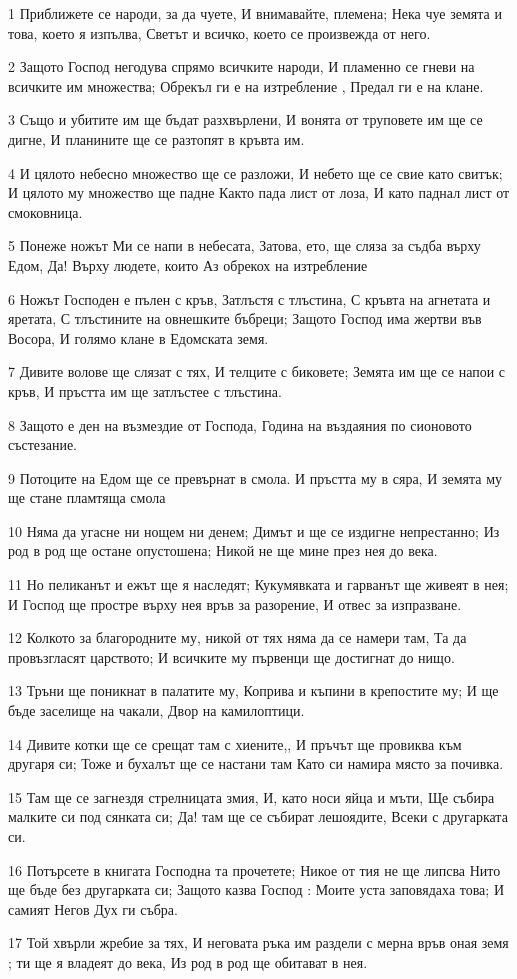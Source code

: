 \par 1 Приближете се народи, за да чуете, И внимавайте, племена; Нека чуе земята и това, което я изпълва, Светът и всичко, което се произвежда от него.
\par 2 Защото Господ негодува спрямо всичките народи, И пламенно се гневи на всичките им множества; Обрекъл ги е на изтребление , Предал ги е на клане.
\par 3 Също и убитите им ще бъдат разхвърлени, И вонята от труповете им ще се дигне, И планините ще се разтопят в кръвта им.
\par 4 И цялото небесно множество ще се разложи, И небето ще се свие като свитък; И цялото му множество ще падне Както пада лист от лоза, И като паднал лист от смоковница.
\par 5 Понеже ножът Ми се напи в небесата, Затова, ето, ще сляза за съдба върху Едом, Да! Върху людете, които Аз обрекох на изтребление
\par 6 Ножът Господен е пълен с кръв, Затлъстя с тлъстина, С кръвта на агнетата и яретата, С тлъстините на овнешките бъбреци; Защото Господ има жертви във Восора, И голямо клане в Едомската земя.
\par 7 Дивите волове ще слязат с тях, И телците с биковете; Земята им ще се напои с кръв, И пръстта им ще затлъстее с тлъстина.
\par 8 Защото е ден на възмездие от Господа, Година на въздаяния по сионовото състезание.
\par 9 Потоците на Едом ще се превърнат в смола. И пръстта му в сяра, И земята му ще стане пламтяща смола
\par 10 Няма да угасне ни нощем ни денем; Димът и ще се издигне непрестанно; Из род в род ще остане опустошена; Никой не ще мине през нея до века.
\par 11 Но пеликанът и ежът ще я наследят; Кукумявката и гарванът ще живеят в нея; И Господ ще простре върху нея връв за разорение, И отвес за изпразване.
\par 12 Колкото за благородните му, никой от тях няма да се намери там, Та да провъзгласят царството; И всичките му първенци ще достигнат до нищо.
\par 13 Тръни ще поникнат в палатите му, Коприва и къпини в крепостите му; И ще бъде заселище на чакали, Двор на камилоптици.
\par 14 Дивите котки ще се срещат там с хиените,, И пръчът ще провиква към другаря си; Тоже и бухалът ще се настани там Като си намира място за почивка.
\par 15 Там ще се загнездя стрелницата змия, И, като носи яйца и мъти, Ще събира малките си под сянката си; Да! там ще се събират лешоядите, Всеки с другарката си.
\par 16 Потърсете в книгата Господна та прочетете; Никое от тия не ще липсва Нито ще бъде без другарката си; Защото казва Господ : Моите уста заповядаха това; И самият Негов Дух ги събра.
\par 17 Той хвърли жребие за тях, И неговата ръка им раздели с мерна връв оная земя ; ти ще я владеят до века, Из род в род ще обитават в нея.

